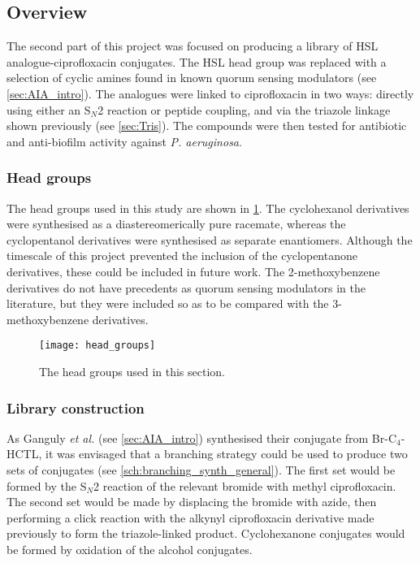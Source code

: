 \subsection{Overview}

The second part of this project was focused on producing a library of HSL analogue-ciprofloxacin conjugates. The HSL head group was replaced with a selection of cyclic amines found in known quorum sensing modulators (see \ref{sec:AIA_intro}). 
The analogues were linked to ciprofloxacin  in two ways: directly using either an S$_N$2 reaction or peptide coupling, and via the triazole linkage shown previously (see \ref{sec:Tris}).
The compounds were then tested for antibiotic and anti-biofilm activity against \textit{P. aeruginosa}.

\subsubsection{Head groups\label{sec:heads}}

The head groups used in this study are shown in \ref{fig:head_groups}. The cyclohexanol derivatives were synthesised as a diastereomerically pure racemate, whereas the cyclopentanol derivatives were synthesised as separate enantiomers. 
Although the timescale of this project prevented the inclusion of the cyclopentanone derivatives, these could be included in future work.
The 2-methoxybenzene derivatives do not have precedents as quorum sensing modulators in the literature, but they were included so as to be compared with the 3-methoxybenzene derivatives.

\begin{figure}[H]
	\begin{center}
		\texttt{[image: head\_groups]}
		\caption{The head groups used in this section.\label{fig:head_groups}}
	\end{center}
\end{figure}

\subsubsection{Library construction\label{sec:branch}}

As Ganguly \textit{et al.}\cite{Ganguly2011}  (see \ref{sec:AIA_intro}) synthesised their conjugate from Br-C$_4$-HCTL, it was envisaged that a branching strategy could be used to produce two sets of conjugates (see \ref{sch:branching_synth_general}). The first set would be formed by the S$_N$2 reaction of the relevant bromide with methyl ciprofloxacin. The second set would be made by displacing the bromide with azide, then performing a click reaction with the alkynyl ciprofloxacin derivative  made previously to form the triazole-linked product. Cyclohexanone conjugates would be formed by oxidation of the alcohol conjugates.

